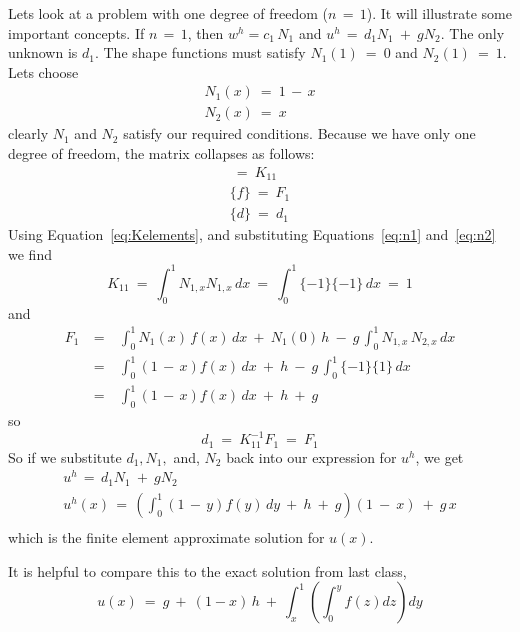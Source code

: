 \documentclass{article}
\begin{document}
Lets look at a problem with one degree of freedom ($n\, =\, 1$).   It will
illustrate some important concepts.   If $n\, =\, 1$, then $w^h = c_1 \, N_1$
and $u^h \, = \, d_1 N_1 ~+~ g N_2$.  The only unknown is $d_1$.   The shape
functions must satisfy $N_1(1) ~=~ 0$ and $N_2(1) ~=~ 1$.   Lets choose 
\begin{eqnarray}
N_1(x) ~=~ 1 \, - \, x \label{eq:n1} \\
N_2(x) ~=~ x \label{eq:n2}
\end{eqnarray}
clearly $N_1$ and $N_2$ satisfy our required conditions.   Because we have only
one degree of freedom, the matrix collapses as follows:
\begin{eqnarray}
[K] ~=~ K_{11} \\
\{f\} ~=~ F_1 \\
\{d\} ~=~ d_1
\end{eqnarray}
Using Equation~\ref{eq:Kelements}, and substituting Equations~\ref{eq:n1}
and~\ref{eq:n2} we find
\begin{equation}
K_{11} ~=~ \int _0 ^1 N_{1,x} N_{1,x} \, dx ~=~ \int _0 ^1 \{ -1\} \{-1\} \, dx
~=~ 1
\end{equation}
and
\begin{eqnarray}
F_1 &~=~& \int _0 ^1 N_1(x) \, f(x) \, dx ~+~ N_1(0) \, h ~-~  g \, \int _0 ^1
N_{1,x} \, N_{2,x} \, dx \nonumber \\
    &~=~& \int _0 ^1 \left (1\, -\, x \right ) f(x) \, dx ~+~ h ~-~  
g \,  \int _0 ^1 \{ -1 \} \{ 1 \} \, dx \nonumber \\
    &~=~& \int _0 ^1 \left (1\, -\, x \right ) f(x) \, dx ~+~ h ~+~ g
\end{eqnarray} 
so
\begin{equation}
d_1 ~=~ K_{11}^{-1} F_1 ~=~ F_1
\end{equation}
So if we substitute $d_1, N_1,$ and, $ N_2$ back into our expression for $u^h$,
we get
\begin{eqnarray}
u^h \, = \, d_1 N_1 ~+~ g N_2 \\
u^h (x) \, = \, \left ( \int _0 ^1 \left (1\, -\, y \right ) f(y) \, dy ~+~ h ~+~
g \right ) \left ( 1 ~-~ x \right ) ~+~ g \, x \\
\end{eqnarray}
which is the finite element approximate solution for $u(x)$.

It is helpful to compare this to the exact solution from last class,
\begin{equation} 
u(x) ~=~ g ~+~ (1 - x) \, h ~+~ \int_x^1 \left ( \int_0^y f(z) dz \right ) dy
\end{equation}
\end{document}
